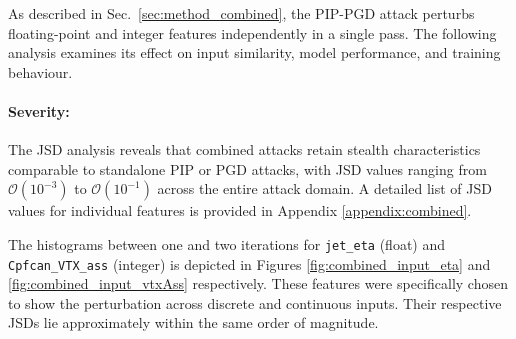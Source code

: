 As described in Sec.~\ref{sec:method_combined}, the PIP-PGD attack perturbs floating-point and integer features independently in a single pass. The following analysis examines its effect on input similarity, model performance, and training behaviour.


\paragraph{Severity:} The JSD analysis reveals that combined attacks retain stealth characteristics comparable to standalone PIP or PGD attacks, with JSD values ranging from $\mathcal{O}(10^{-3})$ to $\mathcal{O}(10^{-1})$ across the entire attack domain. A detailed list of JSD values for individual features is provided in Appendix \ref{appendix:combined}.

The histograms between one and two iterations for \texttt{jet\_eta} (float) and \texttt{Cpfcan\_VTX\_ass} (integer) is depicted in Figures \ref{fig:combined_input_eta} and \ref{fig:combined_input_vtxAss} respectively. These features were specifically chosen to show the perturbation across discrete and continuous inputs. Their respective JSDs lie approximately within the same order of magnitude.

